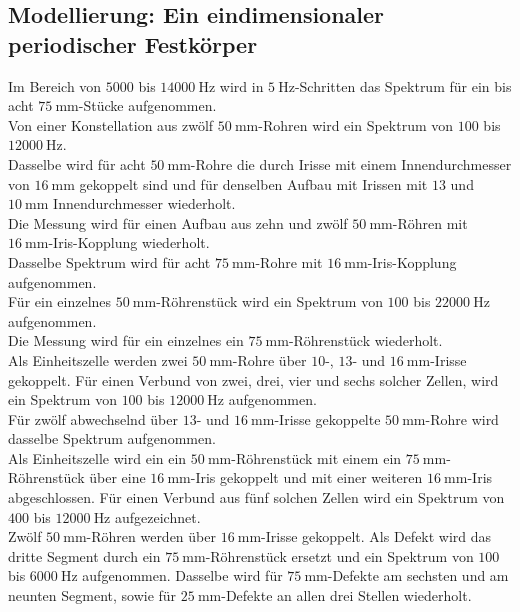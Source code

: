\subsection{Modellierung: Ein eindimensionaler periodischer Festkörper}
Im Bereich von  $5000$ bis $\SI{14000}{\hertz}$ wird in $\SI{5}{\hertz}$-Schritten das Spektrum für ein bis acht $\SI{75}{\milli\metre}$-Stücke aufgenommen.\\
Von einer Konstellation aus zwölf $\SI{50}{\milli\metre}$-Rohren wird ein Spektrum von $100$ bis $\SI{12000}{\hertz}$.\\
Dasselbe wird für acht $\SI{50}{\milli\metre}$-Rohre die durch Irisse mit einem Innendurchmesser von $\SI{16}{\milli\metre}$ gekoppelt sind und für denselben Aufbau mit Irissen mit $13$ und $\SI{10}{\milli\metre}$ Innendurchmesser wiederholt.\\
Die Messung wird für einen Aufbau aus zehn und zwölf $\SI{50}{\milli\metre}$-Röhren mit $\SI{16}{\milli\metre}$-Iris-Kopplung wiederholt. \\
Dasselbe Spektrum wird für acht $\SI{75}{\milli\metre}$-Rohre mit $\SI{16}{\milli\metre}$-Iris-Kopplung aufgenommen.\\
Für ein einzelnes $\SI{50}{\milli\metre}$-Röhrenstück wird ein Spektrum von $100$ bis $\SI{22000}{\hertz}$ aufgenommen.\\
Die Messung wird für ein einzelnes ein $\SI{75}{\milli\metre}$-Röhrenstück wiederholt.\\
Als Einheitszelle werden zwei $\SI{50}{\milli\metre}$-Rohre über $10$-, $13$- und $\SI{16}{\milli\metre}$-Irisse gekoppelt.
Für einen Verbund von zwei, drei, vier und sechs solcher Zellen, wird ein Spektrum von $100$ bis $\SI{12000}{\hertz}$ aufgenommen.\\
Für zwölf abwechselnd über $13$- und $\SI{16}{\milli\metre}$-Irisse gekoppelte $\SI{50}{\milli\metre}$-Rohre wird dasselbe Spektrum aufgenommen.\\
Als Einheitszelle wird ein ein $\SI{50}{\milli\metre}$-Röhrenstück mit einem ein $\SI{75}{\milli\metre}$-Röhrenstück über eine $\SI{16}{\milli\metre}$-Iris gekoppelt und mit einer weiteren $\SI{16}{\milli\metre}$-Iris abgeschlossen.
Für einen Verbund aus fünf solchen Zellen wird ein Spektrum von $400$ bis $\SI{12000}{\hertz}$ aufgezeichnet.\\
Zwölf $\SI{50}{\milli\metre}$-Röhren werden über $\SI{16}{\milli\metre}$-Irisse gekoppelt.
Als Defekt wird das dritte Segment durch ein $\SI{75}{\milli\metre}$-Röhrenstück ersetzt und ein Spektrum von $100$ bis $\SI{6000}{\hertz}$ aufgenommen.
Dasselbe wird für $\SI{75}{\milli\metre}$-Defekte am sechsten und am neunten Segment, sowie für $\SI{25}{\milli\metre}$-Defekte an allen drei Stellen wiederholt.

